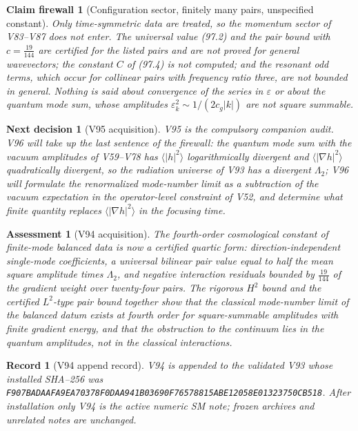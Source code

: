 \documentclass[11pt]{article}
\newtheorem{firewall}[theorem]{Claim firewall}
\newtheorem{decision}[theorem]{Next decision}
\newtheorem{assessment}[theorem]{Assessment}
\newtheorem{record}[theorem]{Record}
\theoremstyle{remark}
\begin{document}
\begin{firewall}[Configuration sector, finitely many pairs, unspecified constant]
\label{fire:v19v94}
Only time-symmetric data are treated, so the momentum sector of
V83--V87 does not enter.  The universal value (97.2) and the pair
bound with \(c=\tfrac{19}{144}\) are certified for the listed pairs and
are not proved for general wavevectors; the constant \(C\) of (97.4)
is not computed; and the resonant odd terms, which occur for
collinear pairs with frequency ratio three, are not bounded in
general.  Nothing is said about convergence of the series in
\(\varepsilon\) or about the quantum mode sum, whose amplitudes
\(\varepsilon_k^2\sim1/(2c_g|k|)\) are not square summable.
\end{firewall}

\begin{decision}[V95 acquisition]
\label{dec:v19v94-next}
V95 is the compulsory companion audit.  V96 will take up the last
sentence of the firewall: the quantum mode sum with the vacuum
amplitudes of V59--V78 has \(\langle|h|^2\rangle\) logarithmically
divergent and \(\langle|\nabla h|^2\rangle\) quadratically divergent,
so the radiation universe of V93 has a divergent \(\Lambda_2\); V96
will formulate the renormalized mode-number limit as a subtraction
of the vacuum expectation in the operator-level constraint of V52,
and determine what finite quantity replaces \(\langle|\nabla h|^2\rangle\)
in the focusing time.
\end{decision}

\begin{assessment}[V94 acquisition]
\label{ass:v19v94}
The fourth-order cosmological constant of finite-mode balanced data
is now a certified quartic form: direction-independent single-mode
coefficients, a universal bilinear pair value equal to half the mean
square amplitude times \(\Lambda_2\), and negative interaction
residuals bounded by \(\tfrac{19}{144}\) of the gradient weight over
twenty-four pairs.  The rigorous \(H^2\) bound and the certified
\(L^2\)-type pair bound together show that the classical
mode-number limit of the balanced datum exists at fourth order for
square-summable amplitudes with finite gradient energy, and that the
obstruction to the continuum lies in the quantum amplitudes, not in
the classical interactions.
\end{assessment}

\begin{record}[V94 append record]
\label{rec:v19v94}
V94 is appended to the validated V93 whose installed SHA--256 was
\texttt{F907BADAAFA9EA70378F0DAA941B03690F76578815ABE12058E01323750CB518}.
After installation only V94 is the active numeric SM note; frozen
archives and unrelated notes are unchanged.
\end{record}
\end{document}
